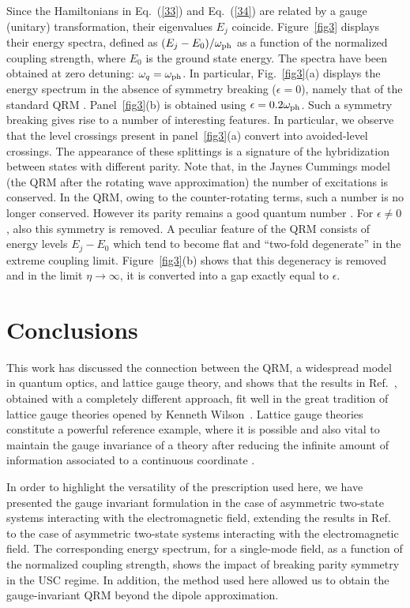 \documentclass[aps,pra,reprint, superscriptaddress,amsmath,showpacs,longbibliography]{revtex4-2}
\newcommand{\figref}[1]{\mbox{Fig.~\ref{#1}}}
\renewcommand{\eqref}[1]{\mbox{Eq.~(\ref{#1})}}
\newcommand{\qum}[1]{``#1''}
\begin{document}
Since the Hamiltonians in \eqref{33} and  \eqref{34} are related by a gauge (unitary) transformation, their eigenvalues $E_j$ coincide. Figure~\ref{fig3} displays their energy spectra, defined as $(E_j - E_0)/ \omega_{\rm ph}$ as a function of the normalized coupling strength, where $E_0$ is the ground state energy. The spectra have been obtained at zero detuning: $\omega_q = \omega_{\rm ph}$. In particular, \figref{fig3}(a) displays the energy spectrum in the absence of symmetry breaking ($\epsilon = 0$), namely that of the standard QRM \cite{DiStefano2019}. Panel~\ref{fig3}(b) is obtained using $\epsilon = 0.2 \omega_{\rm ph}$. Such a symmetry breaking gives rise to a number of interesting features. In particular, we observe that the level crossings present in panel~\ref{fig3}(a) convert into avoided-level crossings. The appearance of these splittings is a signature of the hybridization between states with different parity. Note that, in the Jaynes Cummings  model (the QRM after the rotating wave approximation) the number of excitations is conserved. In the QRM, owing to the counter-rotating terms, such a number is no 
longer conserved. However its parity remains a good quantum number \cite{Kockum2018}.
For $\epsilon \neq 0$, also this symmetry is removed.
A peculiar feature of the QRM  consists of energy levels $E_j - E_0$ which tend to become flat and \qum{two-fold degenerate} in the extreme coupling limit. Figure~\ref{fig3}(b) shows that this degeneracy is removed and in the limit $\eta \to \infty$, it is converted into a gap exactly equal to $\epsilon$.


\section{Conclusions}

This work has  discussed the connection between the QRM, a widespread  model in quantum optics, and lattice gauge theory, and shows that the results in Ref.~\cite{DiStefano2019}, obtained with a completely different approach,
{fit} well in the great tradition of lattice gauge theories opened by Kenneth Wilson~\cite{Wiese2013}.
Lattice gauge theories
{constitute a powerful reference example, where it is} possible and also  vital to maintain the gauge invariance of a theory after reducing the infinite amount of information associated to a continuous coordinate \cite{Wiese2013}.


In order to highlight the versatility of the prescription used here, we have presented the gauge invariant formulation in  the case of asymmetric two-state systems interacting with the electromagnetic field, extending 
the results in Ref.~\cite{DiStefano2019} to the case of asymmetric two-state systems interacting with the electromagnetic field. The corresponding energy spectrum, for a single-mode field, as a function of the normalized coupling strength, shows the impact of breaking parity symmetry in the USC regime.
In addition, the method used here allowed us to obtain the gauge-invariant QRM beyond the dipole approximation.
\end{document}
